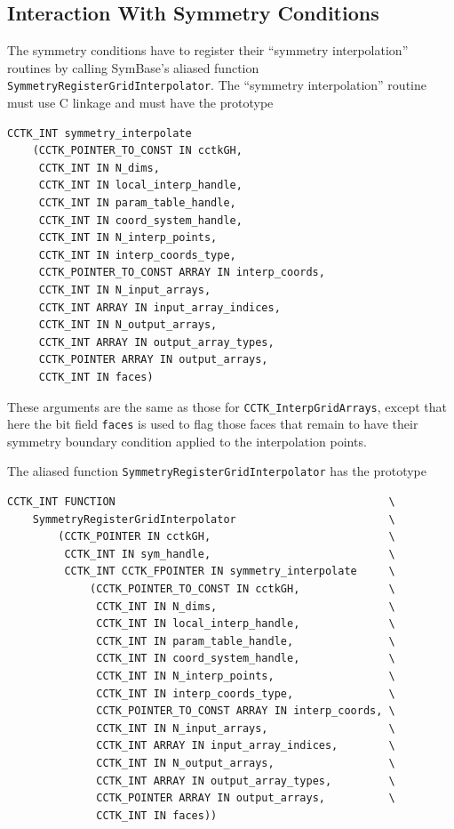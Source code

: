 \subsection{Interaction With Symmetry Conditions}

The symmetry conditions have to register their ``symmetry
interpolation'' routines by calling SymBase's aliased function
\texttt{SymmetryRegisterGridInterpolator}.  The ``symmetry
interpolation'' routine must use C linkage and must have the prototype

\begin{verbatim}
CCTK_INT symmetry_interpolate
    (CCTK_POINTER_TO_CONST IN cctkGH,
     CCTK_INT IN N_dims,
     CCTK_INT IN local_interp_handle,
     CCTK_INT IN param_table_handle,
     CCTK_INT IN coord_system_handle,
     CCTK_INT IN N_interp_points,
     CCTK_INT IN interp_coords_type,
     CCTK_POINTER_TO_CONST ARRAY IN interp_coords,
     CCTK_INT IN N_input_arrays,
     CCTK_INT ARRAY IN input_array_indices,
     CCTK_INT IN N_output_arrays,
     CCTK_INT ARRAY IN output_array_types,
     CCTK_POINTER ARRAY IN output_arrays,
     CCTK_INT IN faces)
\end{verbatim}

These arguments are the same as those for \texttt{CCTK\_InterpGridArrays},
except that here the bit field \texttt{faces} is used to flag those faces
that remain to have their symmetry boundary condition applied to the
interpolation points. 

The aliased function \texttt{SymmetryRegisterGridInterpolator} has the
prototype

\begin{verbatim}
CCTK_INT FUNCTION                                           \
    SymmetryRegisterGridInterpolator                        \
        (CCTK_POINTER IN cctkGH,                            \
         CCTK_INT IN sym_handle,                            \
         CCTK_INT CCTK_FPOINTER IN symmetry_interpolate     \
             (CCTK_POINTER_TO_CONST IN cctkGH,              \
              CCTK_INT IN N_dims,                           \
              CCTK_INT IN local_interp_handle,              \
              CCTK_INT IN param_table_handle,               \
              CCTK_INT IN coord_system_handle,              \
              CCTK_INT IN N_interp_points,                  \
              CCTK_INT IN interp_coords_type,               \
              CCTK_POINTER_TO_CONST ARRAY IN interp_coords, \
              CCTK_INT IN N_input_arrays,                   \
              CCTK_INT ARRAY IN input_array_indices,        \
              CCTK_INT IN N_output_arrays,                  \
              CCTK_INT ARRAY IN output_array_types,         \
              CCTK_POINTER ARRAY IN output_arrays,          \
              CCTK_INT IN faces))
\end{verbatim}

